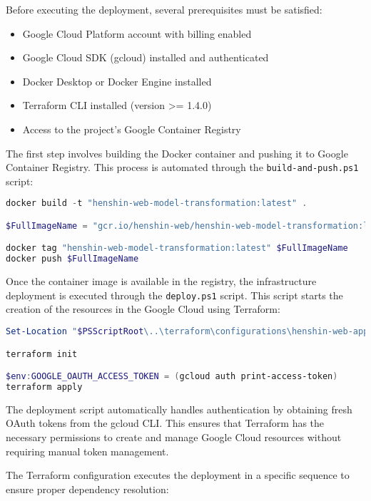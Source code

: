 Before executing the deployment, several prerequisites must be satisfied:

\begin{itemize}
    \item Google Cloud Platform account with billing enabled
    \item Google Cloud SDK (gcloud) installed and authenticated
    \item Docker Desktop or Docker Engine installed
    \item Terraform CLI installed (version >= 1.4.0)
    \item Access to the project's Google Container Registry
\end{itemize}

The first step involves building the Docker container and pushing it to Google Container Registry. This process is automated through the \texttt{build-and-push.ps1} script:

\begin{lstlisting}[language=powershell, caption=Container Build Process]
docker build -t "henshin-web-model-transformation:latest" .

$FullImageName = "gcr.io/henshin-web/henshin-web-model-transformation:latest"

docker tag "henshin-web-model-transformation:latest" $FullImageName
docker push $FullImageName
\end{lstlisting}

Once the container image is available in the registry, the infrastructure deployment is executed through the \texttt{deploy.ps1} script. This script starts the creation of the resources in the Google Cloud using Terraform:

\begin{lstlisting}[language=powershell, caption=Infrastructure Deployment]
Set-Location "$PSScriptRoot\..\terraform\configurations\henshin-web-app"

terraform init

$env:GOOGLE_OAUTH_ACCESS_TOKEN = (gcloud auth print-access-token)
terraform apply
\end{lstlisting}

The deployment script automatically handles authentication by obtaining fresh OAuth tokens from the gcloud CLI. This ensures that Terraform has the necessary permissions to create and manage Google Cloud resources without requiring manual token management.

The Terraform configuration executes the deployment in a specific sequence to ensure proper dependency resolution:


